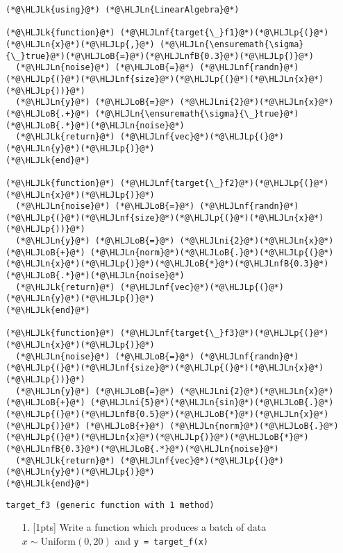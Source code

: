 \documentclass[12pt,a4paper]{article}
\newcommand{\HLJLk}[1]{\textcolor[RGB]{148,91,176}{\textbf{#1}}}
\newcommand{\HLJLn}[1]{#1}
\newcommand{\HLJLnf}[1]{\textcolor[RGB]{66,102,213}{#1}}
\newcommand{\HLJLnfB}[1]{\textcolor[RGB]{59,151,46}{#1}}
\newcommand{\HLJLni}[1]{\textcolor[RGB]{59,151,46}{#1}}
\newcommand{\HLJLoB}[1]{\textcolor[RGB]{102,102,102}{\textbf{#1}}}
\newcommand{\HLJLp}[1]{#1}
\begin{document}
\begin{lstlisting}
(*@\HLJLk{using}@*) (*@\HLJLn{LinearAlgebra}@*)

(*@\HLJLk{function}@*) (*@\HLJLnf{target{\_}f1}@*)(*@\HLJLp{(}@*)(*@\HLJLn{x}@*)(*@\HLJLp{,}@*) (*@\HLJLn{\ensuremath{\sigma}{\_}true}@*)(*@\HLJLoB{=}@*)(*@\HLJLnfB{0.3}@*)(*@\HLJLp{)}@*)
  (*@\HLJLn{noise}@*) (*@\HLJLoB{=}@*) (*@\HLJLnf{randn}@*)(*@\HLJLp{(}@*)(*@\HLJLnf{size}@*)(*@\HLJLp{(}@*)(*@\HLJLn{x}@*)(*@\HLJLp{))}@*)
  (*@\HLJLn{y}@*) (*@\HLJLoB{=}@*) (*@\HLJLni{2}@*)(*@\HLJLn{x}@*) (*@\HLJLoB{.+}@*) (*@\HLJLn{\ensuremath{\sigma}{\_}true}@*)(*@\HLJLoB{.*}@*)(*@\HLJLn{noise}@*)
  (*@\HLJLk{return}@*) (*@\HLJLnf{vec}@*)(*@\HLJLp{(}@*)(*@\HLJLn{y}@*)(*@\HLJLp{)}@*)
(*@\HLJLk{end}@*)

(*@\HLJLk{function}@*) (*@\HLJLnf{target{\_}f2}@*)(*@\HLJLp{(}@*)(*@\HLJLn{x}@*)(*@\HLJLp{)}@*)
  (*@\HLJLn{noise}@*) (*@\HLJLoB{=}@*) (*@\HLJLnf{randn}@*)(*@\HLJLp{(}@*)(*@\HLJLnf{size}@*)(*@\HLJLp{(}@*)(*@\HLJLn{x}@*)(*@\HLJLp{))}@*)
  (*@\HLJLn{y}@*) (*@\HLJLoB{=}@*) (*@\HLJLni{2}@*)(*@\HLJLn{x}@*) (*@\HLJLoB{+}@*) (*@\HLJLn{norm}@*)(*@\HLJLoB{.}@*)(*@\HLJLp{(}@*)(*@\HLJLn{x}@*)(*@\HLJLp{)}@*)(*@\HLJLoB{*}@*)(*@\HLJLnfB{0.3}@*)(*@\HLJLoB{.*}@*)(*@\HLJLn{noise}@*)
  (*@\HLJLk{return}@*) (*@\HLJLnf{vec}@*)(*@\HLJLp{(}@*)(*@\HLJLn{y}@*)(*@\HLJLp{)}@*)
(*@\HLJLk{end}@*)

(*@\HLJLk{function}@*) (*@\HLJLnf{target{\_}f3}@*)(*@\HLJLp{(}@*)(*@\HLJLn{x}@*)(*@\HLJLp{)}@*)
  (*@\HLJLn{noise}@*) (*@\HLJLoB{=}@*) (*@\HLJLnf{randn}@*)(*@\HLJLp{(}@*)(*@\HLJLnf{size}@*)(*@\HLJLp{(}@*)(*@\HLJLn{x}@*)(*@\HLJLp{))}@*)
  (*@\HLJLn{y}@*) (*@\HLJLoB{=}@*) (*@\HLJLni{2}@*)(*@\HLJLn{x}@*) (*@\HLJLoB{+}@*) (*@\HLJLni{5}@*)(*@\HLJLn{sin}@*)(*@\HLJLoB{.}@*)(*@\HLJLp{(}@*)(*@\HLJLnfB{0.5}@*)(*@\HLJLoB{*}@*)(*@\HLJLn{x}@*)(*@\HLJLp{)}@*) (*@\HLJLoB{+}@*) (*@\HLJLn{norm}@*)(*@\HLJLoB{.}@*)(*@\HLJLp{(}@*)(*@\HLJLn{x}@*)(*@\HLJLp{)}@*)(*@\HLJLoB{*}@*)(*@\HLJLnfB{0.3}@*)(*@\HLJLoB{.*}@*)(*@\HLJLn{noise}@*)
  (*@\HLJLk{return}@*) (*@\HLJLnf{vec}@*)(*@\HLJLp{(}@*)(*@\HLJLn{y}@*)(*@\HLJLp{)}@*)
(*@\HLJLk{end}@*)
\end{lstlisting}

\begin{lstlisting}
target_f3 (generic function with 1 method)
\end{lstlisting}


\begin{itemize}
\item[1. ] [1pts] Write a function which produces a batch of data $x \sim \text{Uniform}(0,20)$ and \texttt{y = target\_f(x)}

\end{itemize}
\end{document}
